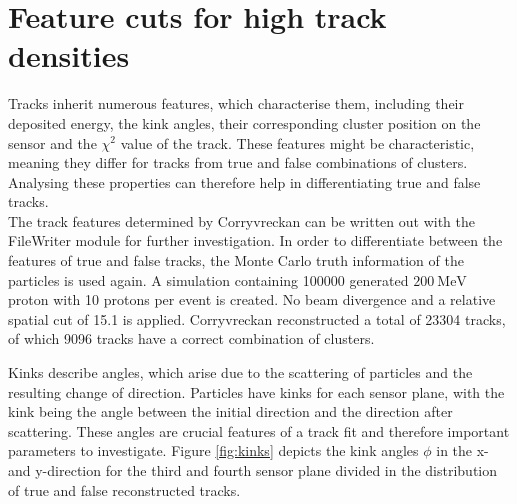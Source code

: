 
\section{Feature cuts for high track densities}\label{sec:feature}
Tracks inherit numerous features, which characterise them,
including their deposited energy, the kink angles, their corresponding cluster position on the sensor and the $\chi^2$ value of the track.
These features might be characteristic, meaning they differ for tracks from true and false combinations of clusters.
Analysing these properties can therefore help in differentiating true and false tracks. \\
The track features determined by Corryvreckan can be written out with the FileWriter module for further investigation.
In order to differentiate between the features of true and false tracks, the Monte Carlo truth information of the particles is used again.
A simulation containing 100000 generated $\SI{200}{\mega\eV}$ proton with 10 protons per event is created. No beam divergence and a relative spatial cut of 15.1 is applied.
Corryvreckan reconstructed a total of 23304 tracks, of which 9096 tracks have a correct combination of clusters.

Kinks describe angles, which arise due to the scattering of particles and the resulting change of direction. Particles have kinks for each sensor plane, with the kink being
the angle between the initial direction and the direction after scattering. These angles are crucial features of a track fit and therefore important parameters to investigate.
Figure \ref{fig:kinks} depicts the kink angles $\phi$ in the x- and y-direction for the third and fourth sensor plane divided in the distribution of true and false reconstructed tracks.

